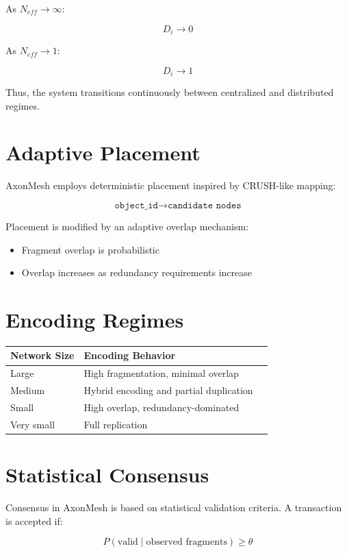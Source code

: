 \documentclass[11pt]{article}
\begin{document}
As $N_{eff} \to \infty$:

\[
D_i \to 0
\]

As $N_{eff} \to 1$:

\[
D_i \to 1
\]

Thus, the system transitions continuously between centralized and distributed regimes.

\section{Adaptive Placement}

AxonMesh employs deterministic placement inspired by CRUSH-like mapping:

\[
\texttt{object\_id} \rightarrow \texttt{candidate\ nodes}
\]

Placement is modified by an adaptive overlap mechanism:
\begin{itemize}
\item Fragment overlap is probabilistic
\item Overlap increases as redundancy requirements increase
\end{itemize}

\section{Encoding Regimes}

\begin{center}
\begin{tabular}{lll}
\toprule
Network Size & Encoding Behavior \\
\midrule
Large & High fragmentation, minimal overlap \\
Medium & Hybrid encoding and partial duplication \\
Small & High overlap, redundancy-dominated \\
Very small & Full replication \\
\bottomrule
\end{tabular}
\end{center}

\section{Statistical Consensus}

Consensus in AxonMesh is based on statistical validation criteria. A transaction is accepted if:

\[
P(\text{valid} \mid \text{observed\ fragments}) \geq \theta
\]
\end{document}
